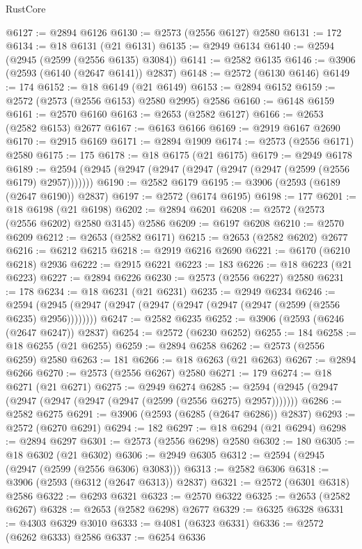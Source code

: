 \begin{lexlean}{RustCore}
\begin{coremodule}
@6127 := @2894 @6126
@6130 := @2573 (@2556 @6127) @2580
@6131 := 172
@6134 := @18 @6131 (@21 @6131)
@6135 := @2949 @6134
@6140 := @2594 (@2945 (@2599 (@2556 @6135) @3084))
@6141 := @2582 @6135
@6146 := @3906 (@2593 (@6140 (@2647 @6141)) @2837)
@6148 := @2572 (@6130 @6146)
@6149 := 174
@6152 := @18 @6149 (@21 @6149)
@6153 := @2894 @6152
@6159 := @2572 (@2573 (@2556 @6153) @2580 @2995) @2586
@6160 := @6148 @6159
@6161 := @2570 @6160
@6163 := @2653 (@2582 @6127)
@6166 := @2653 (@2582 @6153) @2677
@6167 := @6163 @6166
@6169 := @2919 @6167 @2690
@6170 := @2915 @6169
@6171 := @2894 @1909
@6174 := @2573 (@2556 @6171) @2580
@6175 := 175
@6178 := @18 @6175 (@21 @6175)
@6179 := @2949 @6178
@6189 := @2594 (@2945 (@2947 (@2947 (@2947 (@2947 (@2947 (@2599 (@2556 @6179) @2957)))))))
@6190 := @2582 @6179
@6195 := @3906 (@2593 (@6189 (@2647 @6190)) @2837)
@6197 := @2572 (@6174 @6195)
@6198 := 177
@6201 := @18 @6198 (@21 @6198)
@6202 := @2894 @6201
@6208 := @2572 (@2573 (@2556 @6202) @2580 @3145) @2586
@6209 := @6197 @6208
@6210 := @2570 @6209
@6212 := @2653 (@2582 @6171)
@6215 := @2653 (@2582 @6202) @2677
@6216 := @6212 @6215
@6218 := @2919 @6216 @2690
@6221 := @6170 (@6210 @6218) @2936
@6222 := @2915 @6221
@6223 := 183
@6226 := @18 @6223 (@21 @6223)
@6227 := @2894 @6226
@6230 := @2573 (@2556 @6227) @2580
@6231 := 178
@6234 := @18 @6231 (@21 @6231)
@6235 := @2949 @6234
@6246 := @2594 (@2945 (@2947 (@2947 (@2947 (@2947 (@2947 (@2947 (@2599 (@2556 @6235) @2956))))))))
@6247 := @2582 @6235
@6252 := @3906 (@2593 (@6246 (@2647 @6247)) @2837)
@6254 := @2572 (@6230 @6252)
@6255 := 184
@6258 := @18 @6255 (@21 @6255)
@6259 := @2894 @6258
@6262 := @2573 (@2556 @6259) @2580
@6263 := 181
@6266 := @18 @6263 (@21 @6263)
@6267 := @2894 @6266
@6270 := @2573 (@2556 @6267) @2580
@6271 := 179
@6274 := @18 @6271 (@21 @6271)
@6275 := @2949 @6274
@6285 := @2594 (@2945 (@2947 (@2947 (@2947 (@2947 (@2947 (@2599 (@2556 @6275) @2957)))))))
@6286 := @2582 @6275
@6291 := @3906 (@2593 (@6285 (@2647 @6286)) @2837)
@6293 := @2572 (@6270 @6291)
@6294 := 182
@6297 := @18 @6294 (@21 @6294)
@6298 := @2894 @6297
@6301 := @2573 (@2556 @6298) @2580
@6302 := 180
@6305 := @18 @6302 (@21 @6302)
@6306 := @2949 @6305
@6312 := @2594 (@2945 (@2947 (@2599 (@2556 @6306) @3083)))
@6313 := @2582 @6306
@6318 := @3906 (@2593 (@6312 (@2647 @6313)) @2837)
@6321 := @2572 (@6301 @6318) @2586
@6322 := @6293 @6321
@6323 := @2570 @6322
@6325 := @2653 (@2582 @6267)
@6328 := @2653 (@2582 @6298) @2677
@6329 := @6325 @6328
@6331 := @4303 @6329 @3010
@6333 := @4081 (@6323 @6331)
@6336 := @2572 (@6262 @6333) @2586
@6337 := @6254 @6336

\end{coremodule}
\end{lexlean}
